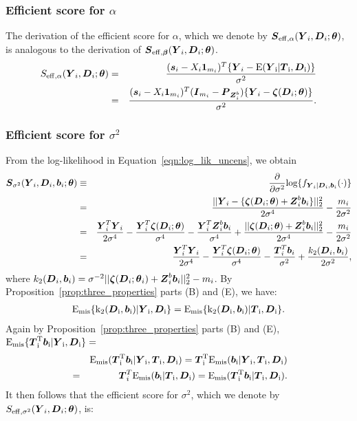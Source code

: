 \documentclass[12pt]{article}
\def\log{\hbox{log}}
\def\bse{\begin{eqnarray*}}
\def\ese{\end{eqnarray*}}
\def\bse{\begin{eqnarray*}}
\def\ese{\end{eqnarray*}}
\def\bw{{\mathbf w}}
\def\bS{{\mathbf S}}
\newcommand{\bzeta}{\mbox{\boldmath $\zeta$}}
\def\bbeta{{\boldsymbol{\beta}}}
\def\btheta{{\boldsymbol{\theta}}}
\def\bone{{\boldsymbol{1}}}
\def\bb{{\boldsymbol b}}
\def\bs{{\boldsymbol s}}
\def\bw{{\boldsymbol w}}
\def\bD{{\boldsymbol D}}
\def\bI{{\boldsymbol I}}
\def\bP{{\boldsymbol P}}
\def\bS{{\boldsymbol S}}
\def\bT{{\boldsymbol T}}
\def\bY{{\boldsymbol Y}}
\def\bZ{{\boldsymbol Z}}
\def\tilD{\bD}
\def\E{\rm E}
\begin{document}
\subsubsection{Efficient score for $\alpha$}
\label{sec:alpha_uncens}
The derivation of the efficient score for $\alpha$, which we denote by $\bS_{\rm{eff},\alpha}(\bY_i,\tilD_i;\btheta)$, is analogous to the derivation of $\bS_{\rm{eff},\bbeta}(\bY_i,\tilD_i;\btheta)$.
\bse
S_{\rm{eff},\alpha}(\bY_i,\tilD_i;\btheta)&=&\frac{(\bs_i-X_i\bone_{m_i})^T\{\bY_i-\E(\bY_i|\bT_i,\tilD_i)\}}{\sigma^2}\\
&=&\frac{(\bs_i-X_i\bone_{m_i})^T(\bI_{m_i}-\bP_{\bZ_i^b})\{\bY_i-\bzeta(\tilD_i;\btheta)\}}{\sigma^2}.
\ese
\subsubsection{Efficient score for $\sigma^2$}
\label{sec:sigma_uncens}
From the log-likelihood in Equation~\eqref{eqn:log_lik_uncens}, we obtain 
\bse
\bS_{\sigma^2}(\bY_i,\tilD_i,\bb_i;\btheta)&\equiv&\frac{\partial}{\partial\sigma^2}\log\{ f_{\bY_i|\tilD_i,\bb_i}(\cdot)\}\\
&=&\frac{||\bY_i-\{\bzeta(\tilD_i;\btheta) + \bZ_i^b\bb_i\}||^2_2}{2\sigma^4}-\frac{m_i}{2\sigma^2}\\
&=&\frac{\bY_i^T\bY_i}{2\sigma^4}-\frac{\bY_i^T\bzeta(\tilD_i;\btheta)}{\sigma^4}-\frac{\bY_i^T\bZ_i^b\bb_i}{\sigma^4}+\frac{||\bzeta(\tilD_i;\btheta)+\bZ_i^b\bb_i||^2_2}{2\sigma^4}-\frac{m_i}{2\sigma^2}\\
&=&\frac{\bY_i^T\bY_i}{2\sigma^4}-\frac{\bY_i^T\bzeta(\tilD_i;\btheta)}{\sigma^4}-\frac{\bT_i^T\bb_i}{\sigma^2}+\frac{k_2(\tilD_i,\bb_i)}{2\sigma^2},
\ese
where $k_2(\tilD_i,\bb_i)=\sigma^{-2}||\bzeta(\tilD_i;\btheta_i)+\bZ_i^b\bb_i||^2_2-m_i$. By Proposition~\ref{prop:three_properties} parts (B) and (E), we have: 
\bse
\E_{\rm{mis}}\{k_2(\tilD_i,\bb_i)|\bY_i,\tilD_i\}
=\E_{\rm{mis}}\{k_2(\tilD_i,\bb_i)|\bT_i,\tilD_i\}.
\ese
Again by Proposition~\ref{prop:three_properties} parts (B) and (E), $\E_{\rm{mis}}\{\bT_i^T\bb_i|\bY_i,\tilD_i\}=$
\bse
&&\E_{\rm{mis}}(\bT_i^T\bb_i|\bY_i,\bT_i,\tilD_i)
=\bT_i^T\E_{\rm{mis}}(\bb_i|\bY_i,\bT_i,\tilD_i)\\
&=&\bT_i^T\E_{\rm{mis}}(\bb_i|\bT_i,\tilD_i)=\E_{\rm{mis}}(\bT_i^T\bb_i|\bT_i,\tilD_i).
\ese
It then follows that the efficient score for $\sigma^2$, which we denote by $S_{\rm{eff},\sigma^2}(\bY_i,\tilD_i;\btheta)$, is:
\end{document}

